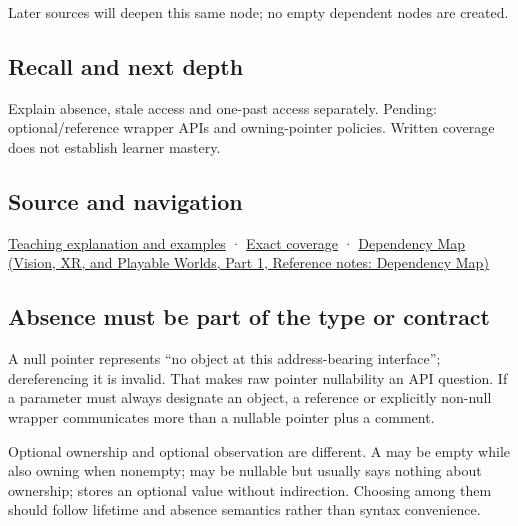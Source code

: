 Later sources will deepen this same node; no empty dependent nodes are created.

\subsection{Recall and next depth}\label{appendix-afae48c31800-recall-and-next-depth}

\hypertarget{appendix-afae48c31800-recall-and-next-depth}{}

Explain absence, stale access and one-past access separately. Pending: optional/reference wrapper APIs and owning-pointer policies. Written coverage does not establish learner mastery.

\subsection{Source and navigation}\label{appendix-afae48c31800-source-and-navigation}

\hypertarget{appendix-afae48c31800-source-and-navigation}{}

\hyperref[01-foundations-i-ch003-a-pointer-carries-an-access-contract]{Teaching explanation and examples} · \hyperref[appendix-fd090d982a15-m008---parts-113-126]{Exact coverage} · \href{../07-Vision-XR-and-Playable-Worlds-P01/main.pdf\#appendix-4ad47bdd269a}{Dependency Map (Vision, XR, and Playable Worlds, Part 1, Reference notes: Dependency Map)}

\subsection{Absence must be part of the type or contract}\label{appendix-afae48c31800-absence-must-be-part-of-the-type-or-contract}

\hypertarget{appendix-afae48c31800-absence-must-be-part-of-the-type-or-contract}{}

A null pointer represents ``no object at this address-bearing interface''; dereferencing it is invalid. That makes raw pointer nullability an API question. If a parameter must always designate an object, a reference or explicitly non-null wrapper communicates more than a nullable pointer plus a comment.

Optional ownership and optional observation are different. A  may be empty while also owning when nonempty;  may be nullable but usually says nothing about ownership;  stores an optional value without indirection. Choosing among them should follow lifetime and absence semantics rather than syntax convenience.

